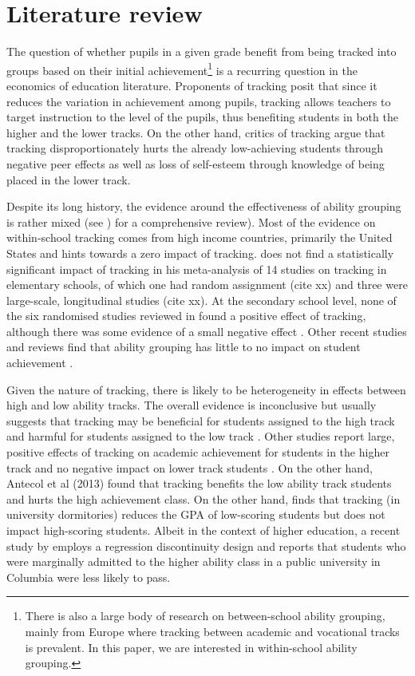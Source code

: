 \documentclass[11pt]{article}
\begin{document}
\section{Literature review}
The question of whether pupils in a given grade benefit from being tracked into groups based on their initial achievement\footnote{There is also a large body of research on between-school ability grouping, mainly from Europe where tracking between academic and vocational tracks is prevalent. In this paper, we are interested in within-school ability grouping.} is a recurring question in the economics of education literature. Proponents of tracking posit that since it reduces the variation in achievement among pupils, tracking allows teachers to target instruction to the level of the pupils, thus benefiting students in both the higher and the lower tracks. On the other hand, critics of tracking argue that tracking disproportionately hurts the already low-achieving students through negative peer effects as well as loss of self-esteem through knowledge of being placed in the lower track. 

Despite its long history, the evidence around the effectiveness of ability grouping is rather mixed (see \cite{betts:2011}) for a comprehensive review). Most of the evidence on within-school tracking comes from high income countries, primarily the United States and hints towards a zero impact of tracking. \citep{slavin:1987} does not find a statistically significant impact of tracking in his meta-analysis of 14 studies on tracking in elementary schools, of which one had random assignment (cite xx) and three were large-scale, longitudinal studies (cite xx). At the secondary school level, none of the six randomised studies reviewed in \cite{slavin1990achievement} found a positive effect of tracking, although there was some evidence of a small negative effect \citep{hanushek2006does}. Other recent studies and reviews find that ability grouping has little to no impact on student achievement \citep{kulikand1987effects, terrin2022effect}.

Given the nature of tracking, there is likely to be heterogeneity in effects between high and low ability tracks. The overall evidence is inconclusive but usually suggests that tracking may be beneficial for students assigned to the high track and harmful for students assigned to the low track \citep{fu2018ability, lavrijsen2015new, burke2013classroom, hoxby2005taking}. Other studies report large, positive effects of tracking on academic achievement for students in the higher track and no negative impact on lower track students \citep{card2016can, vardardottir2013peer, antonovics/black/cullen/meiselman:2022}. On the other hand, \cite{a} Antecol et al (2013) found that tracking benefits the low ability track students and hurts the high achievement class. On the other hand, \cite{garlick} finds that tracking (in university dormitories) reduces the GPA of low-scoring students but does not impact high-scoring students. Albeit in the context of higher education, a recent study by \cite{de2022college} employs a regression discontinuity design and reports that students who were marginally admitted to the higher ability class in a public university in Columbia were less likely to pass. 
\end{document}
